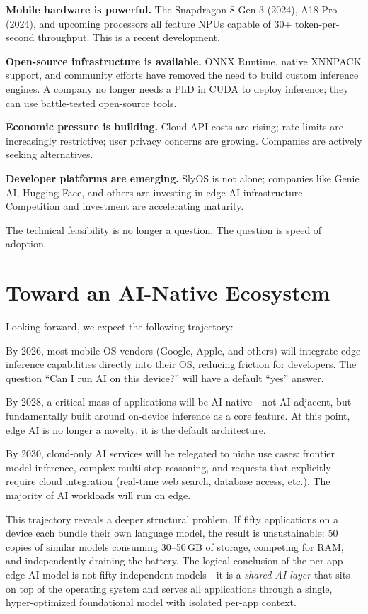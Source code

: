 \documentclass[12pt, letterpaper, twoside]{report}
\begin{document}
\textbf{Mobile hardware is powerful.} The Snapdragon 8 Gen 3 (2024), A18 Pro (2024), and upcoming processors all feature NPUs capable of 30+ token-per-second throughput. This is a recent development.

\textbf{Open-source infrastructure is available.} ONNX Runtime, native XNNPACK support, and community efforts have removed the need to build custom inference engines. A company no longer needs a PhD in CUDA to deploy inference; they can use battle-tested open-source tools.

\textbf{Economic pressure is building.} Cloud API costs are rising; rate limits are increasingly restrictive; user privacy concerns are growing. Companies are actively seeking alternatives.

\textbf{Developer platforms are emerging.} SlyOS is not alone; companies like Genie AI, Hugging Face, and others are investing in edge AI infrastructure. Competition and investment are accelerating maturity.

The technical feasibility is no longer a question. The question is speed of adoption.

\section{Toward an AI-Native Ecosystem}
\label{sec:ai_native_ecosystem}

Looking forward, we expect the following trajectory:

By 2026, most mobile OS vendors (Google, Apple, and others) will integrate edge inference capabilities directly into their OS, reducing friction for developers. The question ``Can I run AI on this device?'' will have a default ``yes'' answer.

By 2028, a critical mass of applications will be AI-native---not AI-adjacent, but fundamentally built around on-device inference as a core feature. At this point, edge AI is no longer a novelty; it is the default architecture.

By 2030, cloud-only AI services will be relegated to niche use cases: frontier model inference, complex multi-step reasoning, and requests that explicitly require cloud integration (real-time web search, database access, etc.). The majority of AI workloads will run on edge.

This trajectory reveals a deeper structural problem. If fifty applications on a device each bundle their own language model, the result is unsustainable: 50 copies of similar models consuming 30--50\,GB of storage, competing for RAM, and independently draining the battery. The logical conclusion of the per-app edge AI model is not fifty independent models---it is a \textit{shared AI layer} that sits on top of the operating system and serves all applications through a single, hyper-optimized foundational model with isolated per-app context.
\end{document}
